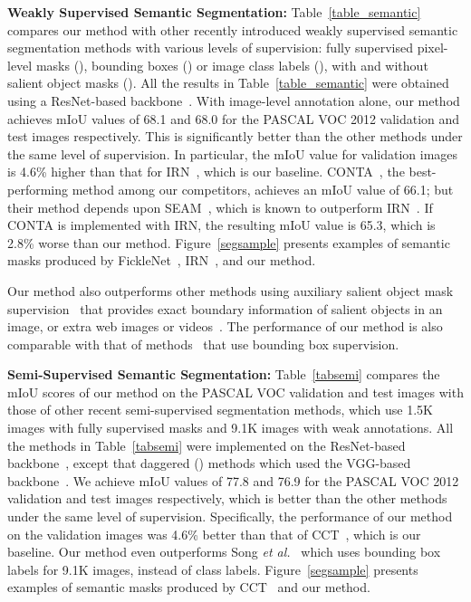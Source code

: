 \documentclass[final]{cvpr}
\begin{document}
{\textbf{Weakly Supervised Semantic Segmentation:}} Table~\ref{table_semantic} compares our method with other recently introduced weakly supervised semantic segmentation methods with various levels of supervision: fully supervised pixel-level masks (), bounding boxes () or image class labels (), with and without salient object masks (). All the results in Table~\ref{table_semantic} were obtained using a ResNet-based backbone~\cite{he2016deep}.
With image-level annotation alone, our method achieves mIoU values of 68.1 and 68.0 for the PASCAL VOC 2012 validation and test images respectively. This is significantly better than the other methods under the same level of supervision. In particular, the mIoU value for validation images is 4.6\% higher than that for IRN~\cite{ahn2019weakly}, which is our baseline.
CONTA~\cite{zhang2020causal}, the best-performing method among our competitors, achieves an mIoU value of 66.1; but their method depends upon SEAM~\cite{wang2020self}, which is known to outperform IRN~\cite{ahn2019weakly}. If CONTA is implemented with IRN, the resulting mIoU value is 65.3, which is 2.8\% worse than our method. Figure~\ref{segsample} presents examples of semantic masks produced by FickleNet~\cite{lee2019ficklenet}, IRN~\cite{ahn2019weakly}, and our method.


Our method also outperforms other methods using auxiliary salient object mask supervision~\cite{li2014secrets, liu2010learning} that provides exact boundary information of salient objects in an image, or extra web images or videos~\cite{sun2020mining, lee2019frame}.
The performance of our method is also comparable with that of methods~\cite{song2019box, khoreva2017simple} that use bounding box supervision.



{\textbf{Semi-Supervised Semantic Segmentation:}} 
Table~\ref{tabsemi} compares the mIoU scores of our method on the PASCAL VOC validation and test images with those of other recent semi-supervised segmentation methods, which use 1.5K images with fully supervised masks and 9.1K images with weak annotations.
All the methods in Table~\ref{tabsemi} were implemented on the ResNet-based backbone~\cite{he2016deep}, except that daggered () methods which used the VGG-based backbone~\cite{simonyan2014very}.
We achieve mIoU values of 77.8 and 76.9 for the PASCAL VOC 2012 validation and test images respectively, which is better than the other methods under the same level of supervision. 
Specifically, the performance of our method on the validation images was 4.6\% better than that of CCT~\cite{ouali2020semi}, which is our baseline. Our method even outperforms Song \textit{et al.}~\cite{song2019box} which uses bounding box labels for 9.1K images, instead of class labels.
Figure~\ref{segsample} presents examples of semantic masks produced by CCT~\cite{ouali2020semi} and our method.
\end{document}
